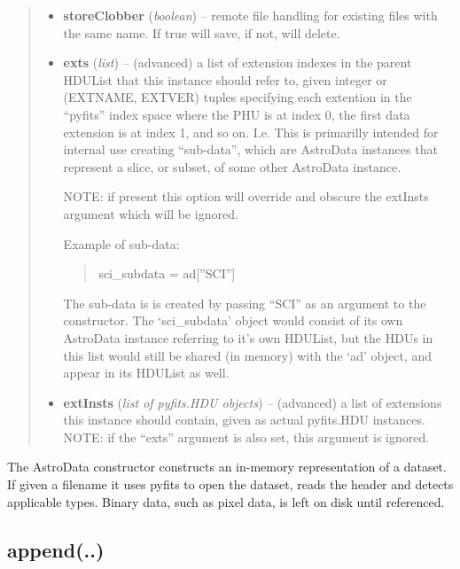 \documentclass[letterpaper,10pt,english]{sphinxmanual}
\begin{document}
\begin{fulllineitems}
\begin{quote}
\begin{description}
\begin{itemize}
\item {} 
\textbf{storeClobber} (\emph{boolean}) -- remote file handling for existing files with the
same name.  If true will save, if not, will delete.

\item {} 
\textbf{exts} (\emph{list}) -- 
(advanced) a list of extension indexes in the parent
HDUList that this instance should refer to, given  integer or 
(EXTNAME, EXTVER) tuples specifying each extention in the ``pyfits''
index space where the PHU is at index 0, the first data extension
is at index 1, and so on. I.e. This is primarilly intended for 
internal use creating ``sub-data'', which are AstroData instances
that represent a slice, or subset, of some other AstroData instance.

NOTE: if present this option will override and obscure the extInsts
argument which will be ignored.

Example of sub-data:
\begin{quote}

sci\_subdata = ad{[}''SCI''{]}
\end{quote}

The sub-data is is created by passing ``SCI'' as an argument to the
constructor. The `sci\_subdata' object would consist of its own 
AstroData instance referring to it's own HDUList, but the HDUs in
this list would still be shared (in memory) with the `ad' object,
and appear in its HDUList as well.


\item {} 
\textbf{extInsts} (\emph{list of pyfits.HDU objects}) -- (advanced) a list of extensions this instance should contain,
given as actual pyfits.HDU instances. NOTE: if the ``exts'' argument
is also set, this argument is ignored.

\end{itemize}

\end{description}\end{quote}

The AstroData constructor constructs an in-memory representation of a
dataset. If given a filename it uses pyfits to open the dataset, reads
the header and detects applicable types. Binary data, such as pixel
data, is left on disk until referenced.

\end{fulllineitems}



\subsection{append(..)}
\label{chapter_AstroDataClass:append}
\end{document}

